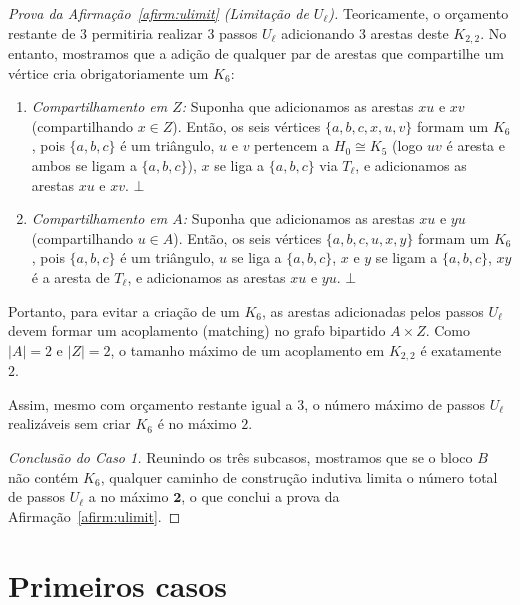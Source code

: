 \documentclass[reqno, 12pt]{amsart}
\numberwithin{equation}{section}
\theoremstyle{plain}
\theoremstyle{definition}
\begin{document}
\begin{proof}[Prova da Afirmação~\ref{afirm:ulimit} (Limitação de $U_\ell$)]
    Teoricamente, o orçamento restante de $3$ permitiria realizar $3$ passos $U_\ell$ adicionando $3$ arestas
    deste $K_{2,2}$. No entanto, mostramos que a adição de qualquer par de arestas que compartilhe um vértice
    cria obrigatoriamente um $K_6$:
    \begin{enumerate}
        \item \emph{Compartilhamento em $Z$:} Suponha que adicionamos as arestas $xu$ e $xv$ (compartilhando $x \in Z$).
              Então, os seis vértices $\{a,b,c,x,u,v\}$ formam um $K_6$, pois $\{a,b,c\}$ é um triângulo,
              $u$ e $v$ pertencem a $H_0 \cong K_5$ (logo $uv$ é aresta e ambos se ligam a $\{a,b,c\}$),
              $x$ se liga a $\{a,b,c\}$ via $T_\ell$, e adicionamos as arestas $xu$ e $xv$. $\bot$
        \item \emph{Compartilhamento em $A$:} Suponha que adicionamos as arestas $xu$ e $yu$ (compartilhando $u \in A$).
              Então, os seis vértices $\{a,b,c,u,x,y\}$ formam um $K_6$, pois $\{a,b,c\}$ é um triângulo,
              $u$ se liga a $\{a,b,c\}$, $x$ e $y$ se ligam a $\{a,b,c\}$, $xy$ é a aresta de $T_\ell$,
              e adicionamos as arestas $xu$ e $yu$. $\bot$
    \end{enumerate}
    Portanto, para evitar a criação de um $K_6$, as arestas adicionadas pelos passos $U_\ell$ devem
    formar um acoplamento (matching) no grafo bipartido $A \times Z$. Como $|A| = 2$ e $|Z| = 2$,
    o tamanho máximo de um acoplamento em $K_{2,2}$ é exatamente $2$.

    Assim, mesmo com orçamento restante igual a $3$, o número máximo de passos $U_\ell$ realizáveis
    sem criar $K_6$ é no máximo $2$.

    \medskip
    \noindent\textit{Conclusão do Caso 1.}
    Reunindo os três subcasos, mostramos que se o bloco $B$ não contém $K_6$,
    qualquer caminho de construção indutiva limita o número total de passos $U_\ell$ a no máximo $\mathbf{2}$,
    o que conclui a prova da Afirmação~\ref{afirm:ulimit}.
\end{proof}


\section{Primeiros casos}
\end{document}
